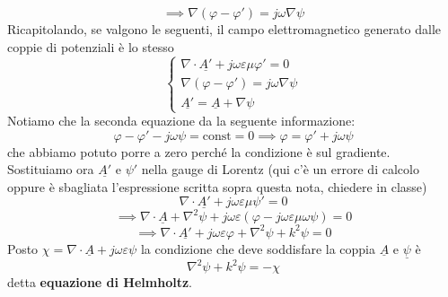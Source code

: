 \documentclass{book}
\begin{document}
            \begin{equation}
                \implies \nabla (\varphi - \varphi ') = j \omega \nabla \psi 
            \end{equation}
            Ricapitolando, se valgono le seguenti, il campo elettromagnetico generato dalle coppie di potenziali è lo stesso
            \begin{equation}
                \begin{cases}
                \nabla \cdot \underline{A'}+j \omega \varepsilon \mu \varphi ' = 0 \\
                \nabla (\varphi - \varphi ') = j \omega \nabla \psi \\
                \underline{A'} = \underline{A} +\nabla \psi  
                \end{cases}
            \end{equation}
            Notiamo che la seconda equazione da la seguente informazione:
            \begin{equation}
                \varphi - \varphi ' -j\omega \psi = \textrm{const} = 0 \implies \varphi = \varphi ' + j \omega \psi
            \end{equation}
            che abbiamo potuto porre a zero perché la condizione è sul gradiente. \\
            Sostituiamo ora $\underline{A'}$ e $\psi '$ nella gauge di Lorentz (qui c'è un errore di calcolo oppure è sbagliata l'espressione scritta sopra questa nota, chiedere in classe)
            \begin{equation}
            \nabla \cdot \underline{A'}+j \omega \varepsilon \mu \psi ' = 0
            \end{equation}
            \begin{equation}
                \implies \nabla \cdot \underline{A} + \nabla ^{2}\psi + j \omega \varepsilon (\varphi - j \omega \varepsilon \mu \omega \psi) = 0
            \end{equation}
            \begin{equation}
                \implies \nabla \cdot \underline{A'} + j \omega \varepsilon \varphi + \nabla ^{2} \psi + k^{2} \psi = 0
            \end{equation}
            Posto $\chi = \nabla \cdot \underline{A}+j \omega \varepsilon \psi$ la condizione che deve soddisfare la coppia $\underline{A}$ e $\underline{\psi}$ è
            \begin{equation}
                \nabla ^{2} \psi + k^{2} \psi = - \chi     
            \end{equation}
            detta \textbf{equazione di Helmholtz}.
\end{document}
